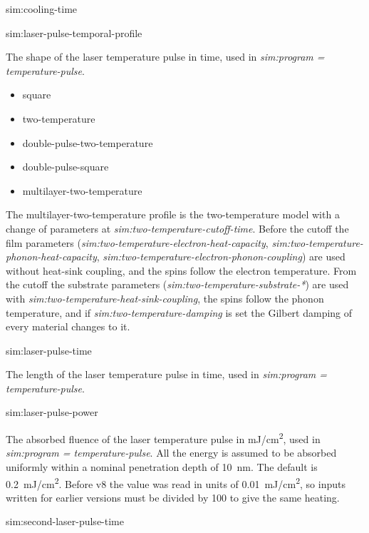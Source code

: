 {\zicf sim:cooling-time}

{\zicf sim:laser-pulse-temporal-profile} The shape of the laser temperature pulse in time, used in \textit{sim:program = temperature-pulse}.

\begin{itemize}
   \item[] square
   \item[] two-temperature
   \item[] double-pulse-two-temperature
   \item[] double-pulse-square
   \item[] multilayer-two-temperature
\end{itemize}

The multilayer-two-temperature profile is the two-temperature model with a change of parameters at
\textit{sim:two-temperature-cutoff-time}. Before the cutoff the film parameters
(\textit{sim:two-temperature-electron-heat-capacity}, \textit{sim:two-temperature-phonon-heat-capacity},
\textit{sim:two-temperature-electron-phonon-coupling}) are used without heat-sink coupling, and the spins
follow the electron temperature. From the cutoff the substrate parameters
(\textit{sim:two-temperature-substrate-*}) are used with \textit{sim:two-temperature-heat-sink-coupling},
the spins follow the phonon temperature, and if \textit{sim:two-temperature-damping} is set the Gilbert
damping of every material changes to it.

{\zicf sim:laser-pulse-time} The length of the laser temperature pulse in time, used in \textit{sim:program = temperature-pulse}.

{\zicf sim:laser-pulse-power} The absorbed fluence of the laser temperature pulse in mJ/cm\textsuperscript{2}, used in \textit{sim:program = temperature-pulse}. All the energy is assumed to be absorbed uniformly within a nominal penetration depth of 10~nm. The default is 0.2~mJ/cm\textsuperscript{2}. Before v8 the value was read in units of 0.01~mJ/cm\textsuperscript{2}, so inputs written for earlier versions must be divided by 100 to give the same heating.

{\zicf sim:second-laser-pulse-time}

